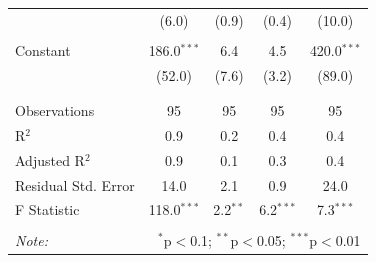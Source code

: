 \documentclass[12pt, a4paper]{article}
\begin{document}
\begin{table}[!htbp]
\begin{tabular}{@{\extracolsep{5pt}}lcccc}
  & (6.0) & (0.9) & (0.4) & (10.0) \\ 
  & & & & \\ 
 Constant & 186.0$^{***}$ & 6.4 & 4.5 & 420.0$^{***}$ \\ 
  & (52.0) & (7.6) & (3.2) & (89.0) \\ 
  & & & & \\ 
\hline \\[-1.8ex] 
Observations & 95 & 95 & 95 & 95 \\ 
R$^{2}$ & 0.9 & 0.2 & 0.4 & 0.4 \\ 
Adjusted R$^{2}$ & 0.9 & 0.1 & 0.3 & 0.4 \\ 
Residual Std. Error & 14.0 & 2.1 & 0.9 & 24.0 \\ 
F Statistic & 118.0$^{***}$ & 2.2$^{**}$ & 6.2$^{***}$ & 7.3$^{***}$ \\ 
\hline 
\hline \\[-1.8ex] 
\textit{Note:}  & \multicolumn{4}{r}{$^{*}$p$<$0.1; $^{**}$p$<$0.05; $^{***}$p$<$0.01} \\ 
\end{tabular} 
\end{table} \clearpage
\end{document}
